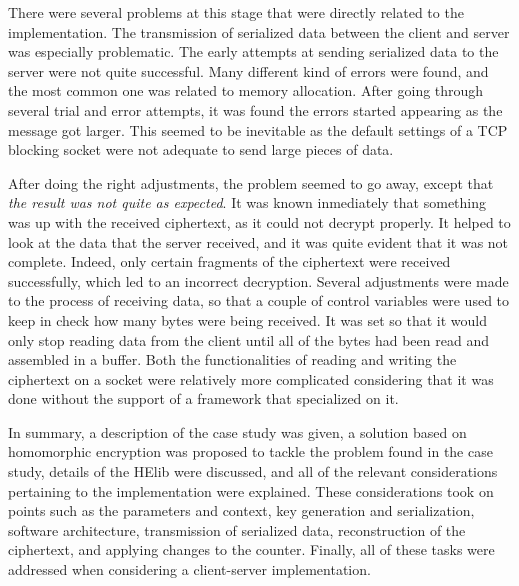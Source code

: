 There were several problems at this stage that were directly related to the implementation. The transmission of serialized data between the client and server was especially problematic. The early attempts at sending serialized data to the server were not quite successful. Many different kind of errors were found, and the most common one was related to memory allocation. After going through several trial and error attempts, it was found the errors started appearing as the message got larger. This seemed to be inevitable as the default settings of a TCP blocking socket were not adequate to send large pieces of data. 

After doing the right adjustments, the problem seemed to go away, except that \textit{the result was not quite as expected}. It was known inmediately that something was up with the received ciphertext, as it could not decrypt properly. It helped to look at the data that the server received, and it was quite evident that it was not complete. Indeed, only certain fragments of the ciphertext were received successfully, which led to an incorrect decryption. Several adjustments were made to the process of receiving data, so that a couple of control variables were used to keep in check how many bytes were being received. It was set so that it would only stop reading data from the client until all of the bytes had been read and assembled in a buffer. Both the functionalities of reading and writing the ciphertext on a socket were relatively more complicated considering that it was done without the support of a framework that specialized on it.


In summary, a description of the case study was given, a solution based on homomorphic encryption was proposed to tackle the problem found in the case study, details of the HElib were discussed, and all of the relevant considerations pertaining to the implementation were explained. These considerations took on points such as the parameters and context, key generation and serialization, software architecture, transmission of serialized data, reconstruction of the ciphertext, and applying changes to the counter. Finally, all of these tasks were addressed when considering a client-server implementation.

\clearpage

